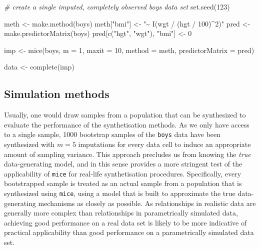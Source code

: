 \documentclass[psych,article,submit,moreauthors,pdftex]{mdpi}
\newenvironment{Shaded}{\begin{snugshade}}{\end{snugshade}}
\newcommand{\AttributeTok}[1]{\textcolor[rgb]{0.77,0.63,0.00}{#1}}
\newcommand{\CommentTok}[1]{\textcolor[rgb]{0.56,0.35,0.01}{\textit{#1}}}
\newcommand{\DecValTok}[1]{\textcolor[rgb]{0.00,0.00,0.81}{#1}}
\newcommand{\FunctionTok}[1]{\textcolor[rgb]{0.00,0.00,0.00}{#1}}
\newcommand{\NormalTok}[1]{#1}
\newcommand{\OtherTok}[1]{\textcolor[rgb]{0.56,0.35,0.01}{#1}}
\newcommand{\StringTok}[1]{\textcolor[rgb]{0.31,0.60,0.02}{#1}}
\begin{document}
\begin{Shaded}
\begin{Highlighting}[]
\CommentTok{\# create a single imputed, completely observed \textasciigrave{}boys\textasciigrave{} data set}
\FunctionTok{set.seed}\NormalTok{(}\DecValTok{123}\NormalTok{)}

\NormalTok{meth }\OtherTok{\textless{}{-}} \FunctionTok{make.method}\NormalTok{(boys)}
\NormalTok{meth[}\StringTok{"bmi"}\NormalTok{] }\OtherTok{\textless{}{-}} \StringTok{"\textasciitilde{} I(wgt / (hgt / 100)\^{}2)"}
\NormalTok{pred }\OtherTok{\textless{}{-}} \FunctionTok{make.predictorMatrix}\NormalTok{(boys)}
\NormalTok{pred[}\FunctionTok{c}\NormalTok{(}\StringTok{"hgt"}\NormalTok{, }\StringTok{"wgt"}\NormalTok{), }\StringTok{"bmi"}\NormalTok{] }\OtherTok{\textless{}{-}} \DecValTok{0}

\NormalTok{imp }\OtherTok{\textless{}{-}} \FunctionTok{mice}\NormalTok{(boys, }
            \AttributeTok{m =} \DecValTok{1}\NormalTok{,}
            \AttributeTok{maxit =} \DecValTok{10}\NormalTok{,}
            \AttributeTok{method =}\NormalTok{ meth,}
            \AttributeTok{predictorMatrix =}\NormalTok{ pred)}

\NormalTok{data }\OtherTok{\textless{}{-}} \FunctionTok{complete}\NormalTok{(imp)}
\end{Highlighting}
\end{Shaded}

\hypertarget{simulation-methods}{%
\subsection{Simulation methods}\label{simulation-methods}}

Usually, one would draw samples from a population that can be
synthesized to evaluate the performance of the synthetisation methods.
As we only have access to a single sample, 1000 bootstrap samples of the
\texttt{boys} data have been synthesized with \(m = 5\) imputations for
every data cell to induce an appropriate amount of sampling variance.
This approach precludes us from knowing the \emph{true} data-generating
model, and in this sense provides a more stringent test of the
applicability of \texttt{mice} for real-life synthetisation procedures.
Specifically, every bootstrapped sample is treated as an actual sample
from a population that is synthesized using \texttt{mice}, using a model
that is built to approximate the true data-generating mechanisms as
closely as possible. As relationships in realistic data are generally
more complex than relationships in parametrically simulated data,
achieving good performance on a real data set is likely to be more
indicative of practical applicability than good performance on a
parametrically simulated data set.
\end{document}
